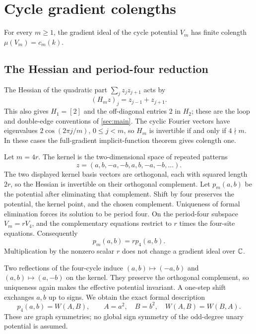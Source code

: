 \section{Cycle gradient colengths}\label{sec:cycles}

\begin{proposition}\label{prop:cycles}
For every $m\geq1$, the gradient ideal of the cycle potential $V_m$ has
finite colength $\mu(V_m)=c_m(k)$.
\end{proposition}

\subsection{The Hessian and period-four reduction}

The Hessian of the quadratic part $\sum_jz_jz_{j+1}$ acts by
\[
 (H_m z)_j=z_{j-1}+z_{j+1}.
\]
This also gives $H_1=[2]$ and the off-diagonal entries $2$ in $H_2$;
these are the loop and double-edge conventions of \cref{sec:main}.
The cyclic Fourier vectors have eigenvalues
$2\cos(2\pi j/m)$, $0\leq j<m$, so $H_m$ is invertible if and only
if $4\nmid m$. In these cases the full-gradient implicit-function theorem
gives colength one.

Let $m=4r$. The kernel is the two-dimensional space of repeated patterns
\begin{equation}\label{eq:cyclekernel}
 z=(a,b,-a,-b,a,b,-a,-b,\ldots).
\end{equation}
The two displayed kernel basis vectors are orthogonal, each with squared
length $2r$, so the Hessian is invertible on their orthogonal complement.
Let $p_m(a,b)$ be the potential after eliminating that complement.
Shift by four preserves the potential, the kernel point, and the chosen
complement. Uniqueness of formal elimination forces its solution to be
period four. On the period-four subspace $V_m=rV_4$, and the complementary
equations restrict to $r$ times the four-site equations. Consequently
\begin{equation}\label{eq:periodfour}
 p_m(a,b)=r p_4(a,b).
\end{equation}
Multiplication by the nonzero scalar $r$ does not change a gradient ideal
over $\mathbb C$.

Two reflections of the four-cycle induce $(a,b)\mapsto(-a,b)$ and
$(a,b)\mapsto(a,-b)$ on the kernel. They preserve the orthogonal
complement, so uniqueness again makes the effective potential invariant.
A one-step shift exchanges $a,b$ up to signs. We obtain the exact formal
description
\begin{equation}\label{eq:W}
 p_4(a,b)=W(A,B),\qquad A=a^2,\quad B=b^2,\quad W(A,B)=W(B,A).
\end{equation}
These are graph symmetries; no global sign symmetry of the odd-degree
unary potential is assumed.

